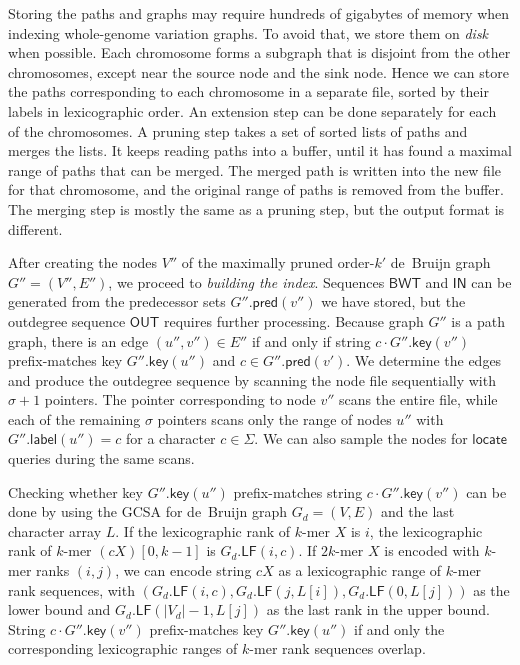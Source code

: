 \documentclass[a4paper,11pt]{llncs}
\newcommand{\abs}[1]{\ensuremath{\lvert #1 \rvert}}
\newcommand{\LF}{\ensuremath{\mathsf{LF}}}
\newcommand{\locate}{\ensuremath{\mathsf{locate}}}
\newcommand{\glabel}{\ensuremath{\mathsf{label}}}
\newcommand{\gpred}{\ensuremath{\mathsf{pred}}}
\newcommand{\gkey}{\ensuremath{\mathsf{key}}}
\newcommand{\kmer}[1]{$#1$\nobreakdash-mer}
\newcommand{\orderk}[1]{order\nobreakdash-$#1$}
\newcommand{\BWT}{\ensuremath{\mathsf{BWT}}}
\newcommand{\bvIN}{\ensuremath{\mathsf{IN}}}
\newcommand{\bvOUT}{\ensuremath{\mathsf{OUT}}}
\begin{document}
Storing the paths and graphs may require hundreds of gigabytes of memory when indexing whole-genome variation graphs. To avoid that, we store them on \emph{disk} when possible. Each chromosome forms a subgraph that is disjoint from the other chromosomes, except near the source node and the sink node. Hence we can store the paths corresponding to each chromosome in a separate file, sorted by their labels in lexicographic order. An extension step can be done separately for each of the chromosomes. A pruning step takes a set of sorted lists of paths and merges the lists. It keeps reading paths into a buffer, until it has found a maximal range of paths that can be merged. The merged path is written into the new file for that chromosome, and the original range of paths is removed from the buffer. The merging step is mostly the same as a pruning step, but the output format is different.

After creating the nodes $V''$ of the maximally pruned \orderk{k'} de~Bruijn graph $G'' = (V'', E'')$, we proceed to \emph{building the index}. Sequences $\BWT$ and $\bvIN$ can be generated from the predecessor sets $G''.\gpred(v'')$ we have stored, but the outdegree sequence $\bvOUT$ requires further processing. Because graph $G''$ is a path graph, there is an edge $(u'', v'') \in E''$ if and only if string $c \cdot G''.\gkey(v'')$ prefix-matches key $G''.\gkey(u'')$ and $c \in G''.\gpred(v')$. We determine the edges and produce the outdegree sequence by scanning the node file sequentially with $\sigma+1$ pointers. The pointer corresponding to node $v''$ scans the entire file, while each of the remaining $\sigma$ pointers scans only the range of nodes $u''$ with $G''.\glabel(u'') = c$ for a character $c \in \Sigma$. We can also sample the nodes for $\locate$ queries during the same scans.

Checking whether key $G''.\gkey(u'')$ prefix-matches string $c \cdot G''.\gkey(v'')$ can be done by using the GCSA for de~Bruijn graph $G_{d} = (V, E)$ and the last character array $L$. If the lexicographic rank of \kmer{k} $X$ is $i$, the lexicographic rank of \kmer{k} $(cX)[0, k-1]$ is $G_{d}.\LF(i, c)$. If \kmer{2k} $X$ is encoded with \kmer{k} ranks $(i, j)$, we can encode string $cX$ as a lexicographic range of \kmer{k} rank sequences, with $(G_{d}.\LF(i, c), G_{d}.\LF(j, L[i]), G_{d}.\LF(0, L[j]))$ as the lower bound and $G_{d}.\LF(\abs{V_{d}}-1, L[j])$ as the last rank in the upper bound. String $c \cdot G''.\gkey(v'')$ prefix-matches key $G''.\gkey(u'')$ if and only the corresponding lexicographic ranges of \kmer{k} rank sequences overlap.
\end{document}
